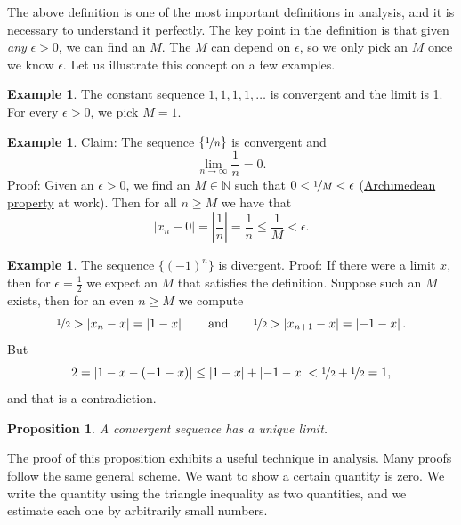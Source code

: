 \documentclass[12pt]{book}
\newcommand{\abs}[1]{\left\lvert {#1} \right\rvert}
\newcommand{\N}{{\mathbb{N}}}
\theoremstyle{plain}
\newtheorem{prop}[thm]{Proposition}
\theoremstyle{remark}
\theoremstyle{definition}
\theoremstyle{exercise}
\theoremstyle{example}
\newtheorem{example}[thm]{Example}
\begin{document}
The above definition is one of the most important definitions in analysis,
and it is necessary to understand it perfectly.  The key point in the
definition is that given \emph{any} $\epsilon > 0$, we can find an $M$.  The
$M$ can depend on $\epsilon$, so we only pick an $M$ once we know
$\epsilon$.  Let us illustrate this concept on a few examples.

\begin{example}
The constant sequence $1,1,1,1,\ldots$ is convergent and the limit is 1.  For
every $\epsilon > 0$, we pick $M = 1$.
\end{example}

\begin{example}
Claim: The sequence $\{ \nicefrac{1}{n} \}$ is convergent and
\begin{equation*}
\lim_{n\to \infty} \frac{1}{n} = 0 .
\end{equation*}
Proof: Given an $\epsilon > 0$, we find an $M \in \N$ such that
$0 < \nicefrac{1}{M} < \epsilon$
(\hyperref[thm:arch:i]{Archimedean property} at work).
Then for all $n \geq M$ we have that
\begin{equation*}
\abs{x_n - 0} = \abs{\frac{1}{n}} = \frac{1}{n} \leq \frac{1}{M} < \epsilon .
\end{equation*}
\end{example}

\begin{example}
The sequence $\{ {(-1)}^n \}$ is divergent.  Proof: If there
were a limit $x$, then for $\epsilon = \frac{1}{2}$ we expect an $M$ that
satisfies the definition.  Suppose
such an $M$ exists, then for an even $n \geq M$ we compute
\begin{equation*}
\nicefrac{1}{2} > \abs{x_n - x}  = \abs{1 - x}
\qquad \text{and} \qquad
\nicefrac{1}{2} > \abs{x_{n+1} - x}  = \abs{-1 - x} .
\end{equation*}
But
\begin{equation*}
2 = \abs{1 - x - (-1 -x)} \leq
\abs{1 - x} + \abs{-1 -x} < \nicefrac{1}{2} + \nicefrac{1}{2} = 1 ,
\end{equation*}
and that is a contradiction.
\end{example}

\begin{prop} \label{prop:limisunique}
A convergent sequence has a unique limit.
\end{prop}

The proof of this proposition exhibits a useful technique in
analysis.  Many proofs follow the same general scheme.  We want to
show a certain quantity is zero.  We write the quantity using the 
triangle inequality as two quantities, and we estimate each one
by arbitrarily small numbers.
\end{document}
